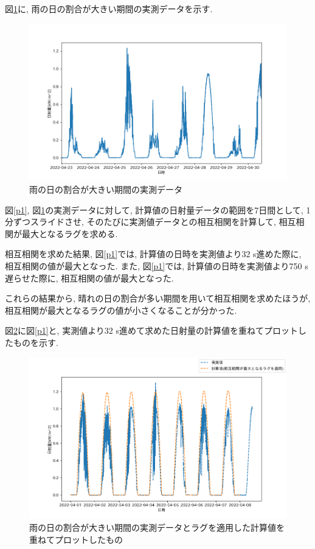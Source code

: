 \documentclass[a4j,12pt,]{jarticle}
\begin{document}
図\ref{p2}に, 雨の日の割合が大きい期間の実測データを示す.

\begin{figure}[H]
  \begin{center}
    \includegraphics[width=160mm]{2.png}
    \caption{雨の日の割合が大きい期間の実測データ}
    \label{p2}
  \end{center}
\end{figure}

図\ref{p1}, 図\ref{p2}の実測データに対して, 計算値の日射量データの範囲を7日間として, 1分ずつスライドさせ, そのたびに実測値データとの相互相関を計算して, 相互相関が最大となるラグを求める.

相互相関を求めた結果, 図\ref{p1}では, 計算値の日時を実測値より32 \si{\second}進めた際に, 相互相関の値が最大となった.
また, 図\ref{p1}では, 計算値の日時を実測値より750 \si{\second}遅らせた際に, 相互相関の値が最大となった.

これらの結果から, 晴れの日の割合が多い期間を用いて相互相関を求めたほうが, 相互相関が最大となるラグの値が小さくなることが分かった.

図\ref{p3}に図\ref{p1}と, 実測値より32 \si{\second}進めて求めた日射量の計算値を重ねてプロットしたものを示す.

\begin{figure}[H]
  \begin{center}
    \includegraphics[width=160mm]{3.png}
    \caption{雨の日の割合が大きい期間の実測データとラグを適用した計算値を重ねてプロットしたもの}
    \label{p3}
  \end{center}
\end{figure}
\end{document}
